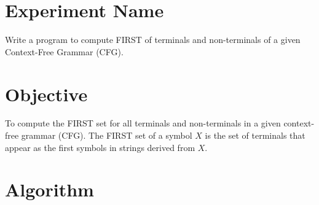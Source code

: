\documentclass[12pt]{article}
\begin{document}
\vspace{1cm}

\section*{Experiment Name}
Write a program to compute FIRST of terminals and non-terminals of a given Context-Free Grammar (CFG).

\section*{Objective}
To compute the FIRST set for all terminals and non-terminals in a given context-free grammar (CFG). The FIRST set of a symbol $X$ is the set of terminals that appear as the first symbols in strings derived from $X$.

\section*{Algorithm}
\end{document}
